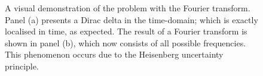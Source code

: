 \begin{figure}[htpb]
	\centering\capstart{}
	\hfill
	\caption[
		A Dirac delta function and the result of a Fourier transform
	]{
		A visual demonstration of the problem with the Fourier transform.
		Panel (a) presents a Dirac delta in the time-domain; which is exactly localised in time, as expected.
		The result of a Fourier transform is shown in panel (b), which now consists of all possible frequencies.
		This phenomenon occurs due to the Heisenberg uncertainty principle.
	}\label{fig:chapter2_dirac_fourier}
\end{figure}
